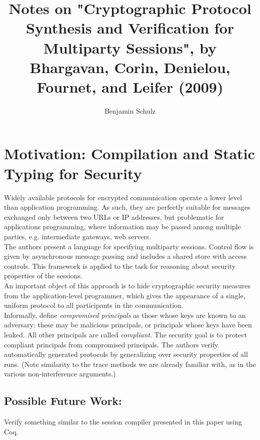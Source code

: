 \documentclass[a4paper,10pt]{article}
\title{Notes on "Cryptographic Protocol Synthesis and Verification for Multiparty Sessions",
by Bhargavan, Corin, Denielou, Fournet, and Leifer (2009)}
\author{Benjamin Schulz}
\begin{document}
\maketitle

\begin{abstract}

\end{abstract}

\section{Motivation: Compilation and Static Typing for Security}

Widely available protocols for encrypted communication operate a lower level than application programming.
As such, they are perfectly suitable for messages exchanged only between two URLs or IP addresses,
but problematic for applications programming, where information may be passed among multiple parties,
e.g. intermediate gateways, web servers.\\

The authors present a language for specifying multiparty sessions.  Control flow is given by asynchronous
message passing and includes a shared store with access controls.  This framework is applied to the
task for reasoning about security properties of the sessions.\\

An important object of this approach is to hide cryptographic security measures from the
application-level programmer, which gives the appearance of a single, uniform protocol to all
participants in the communication.\\

Informally, define \emph{compromised principals} as those whose keys are known to an adversary;
these may be malicious principals, or principals whose keys have been leaked.  All other principals
are called \emph{compliant}.  The security goal is to protect compliant principals from compromised
principals.  The authors verify automatically generated protocols by generalizing over security
properties of all runs.  (Note similarity to the trace methods we are already familiar with,
as in the various non-interference arguments.)\\

\subsection{Possible Future Work:}
Verify something similar to the session compiler presented in this paper using Coq.\\
\\
\end{document}
